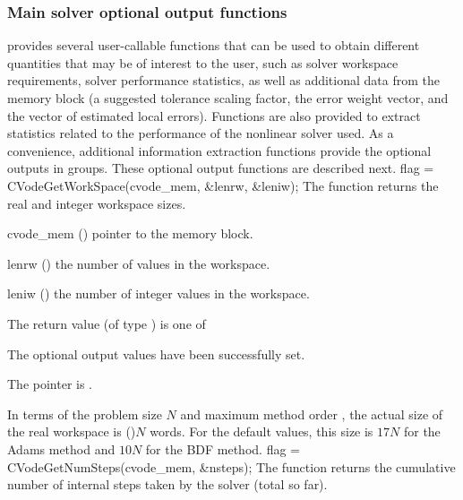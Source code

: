 \subsubsection{Main solver optional output functions}
{\cvodes} provides several user-callable functions that can be used to obtain
different quantities that may be of interest to the user, such as solver workspace
requirements, solver performance statistics, as well as additional data from
the {\cvodes} memory block (a suggested tolerance scaling factor, the error weight
vector, and the vector of estimated local errors). Functions are also provided to
extract statistics related to the performance of the {\cvodes} nonlinear solver
used. As a convenience, additional information extraction functions provide the optional 
outputs in groups.
These optional output functions are described next.
{
  flag = CVodeGetWorkSpace(cvode\_mem, \&lenrw, \&leniw);
}
{
  The function  returns the
  {\cvodes} real and integer workspace sizes.
}
{
  \begin{args}
  \item[cvode\_mem] ()
    pointer to the {\cvodes} memory block.
  \item[lenrw] ()
    the number of  values in the {\cvodes} workspace.
  \item[leniw] ()
    the number of integer values in the {\cvodes} workspace.
  \end{args}
}
{
  The return value  (of type ) is one of
  \begin{args}
  \item[\Id{CV\_SUCCESS}] 
    The optional output values have been successfully set.
  \item[\Id{CV\_MEM\_NULL}]
    The  pointer is .
  \end{args}
}
{
  In terms of the problem size $N$ and maximum method order ,
  the actual size of the real workspace is ()$N$ 
  words.  For the default values, this size is $17 N$ for the Adams method
  and $10 N$ for the BDF method.
}
{
  flag = CVodeGetNumSteps(cvode\_mem, \&nsteps);
}
{
  The function  returns the cumulative number of internal 
  steps taken by the solver (total so far).
}
